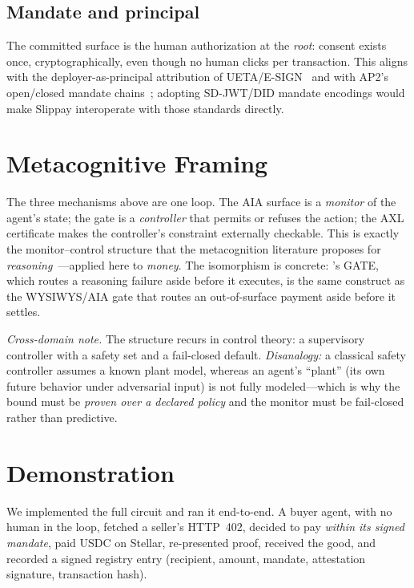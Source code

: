 \documentclass[11pt]{article}
\begin{document}
\subsection{Mandate and principal}
The committed surface is the human authorization at the \emph{root}: consent exists once,
cryptographically, even though no human clicks per transaction. This aligns with the
deployer-as-principal attribution of UETA/E-SIGN~\citep{ueta} and with AP2's open/closed mandate
chains~\citep{ap2auth}; adopting SD-JWT/DID mandate encodings would make Slippay interoperate
with those standards directly.

\section{Metacognitive Framing}
\label{sec:meta}

The three mechanisms above are one loop. The AIA surface is a \emph{monitor} of the agent's
state; the gate is a \emph{controller} that permits or refuses the action; the AXL certificate
makes the controller's constraint externally checkable. This is exactly the monitor--control
structure that the metacognition literature proposes for \emph{reasoning}~\citep{metaframework,
sofai,governed}---applied here to \emph{money}. The isomorphism is concrete:
\citet{governed}'s GATE, which routes a reasoning failure aside before it executes, is the same
construct as the WYSIWYS/AIA gate that routes an out-of-surface payment aside before it settles.

\smallskip
\emph{Cross-domain note.} The structure recurs in control theory: a supervisory controller with
a safety set and a fail-closed default. \emph{Disanalogy:} a classical safety controller assumes
a known plant model, whereas an agent's ``plant'' (its own future behavior under adversarial
input) is not fully modeled---which is why the bound must be \emph{proven over a declared policy}
and the monitor must be fail-closed rather than predictive.

\section{Demonstration}
\label{sec:eval}

We implemented the full circuit and ran it end-to-end. A buyer agent, with no human in the loop,
fetched a seller's HTTP~402, decided to pay \emph{within its signed mandate}, paid USDC on
Stellar, re-presented proof, received the good, and recorded a signed registry entry
(recipient, amount, mandate, attestation signature, transaction hash).
\end{document}
